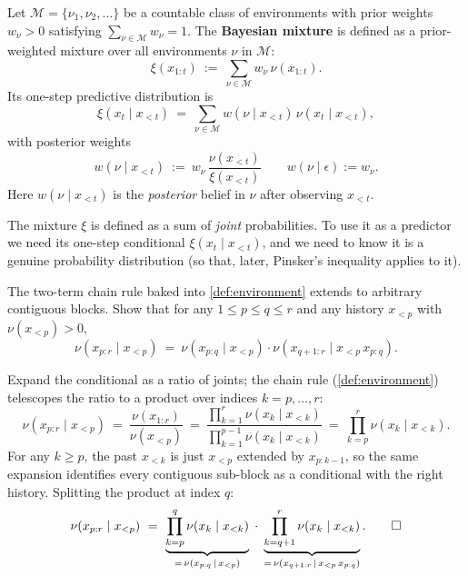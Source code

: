 \documentclass[fontsize=11pt, parskip=half]{scrartcl}
\newcommand{\Mc}{\mathcal{M}}
\begin{document}
\begin{definition}\label{def:mixture}
Let $\Mc = \{\nu_1, \nu_2, \dots\}$ be a countable class of environments with prior weights $w_\nu > 0$ satisfying $\sum_{\nu \in \Mc} w_\nu = 1$. The \textbf{Bayesian mixture} is defined as a prior-weighted mixture over all environments $\nu$ in $\Mc$:
\begin{equation}\label{eq:mixture_expression}
  \xi(x_{1:t}) ~:=~ \sum_{\nu \in \Mc} w_\nu\, \nu(x_{1:t}).
\end{equation}
Its one-step predictive distribution is
\[
  \xi(x_t \mid x_{<t}) ~=~ \sum_{\nu \in \Mc} w(\nu \mid x_{<t})\, \nu(x_t \mid x_{<t}),
\]
with posterior weights 
\[
w(\nu \mid x_{<t}) ~:=~ w_\nu\, \frac{\nu(x_{<t})}{\xi(x_{<t})}
\qquad w(\nu \mid \epsilon) := w_\nu.
\]
Here $w(\nu \mid x_{<t})$ is the \emph{posterior} belief in $\nu$ after observing $x_{<t}$.
\end{definition}

The mixture $\xi$ is defined as a sum of \emph{joint} probabilities. To use it as a predictor we need its one-step conditional $\xi(x_t \mid x_{<t})$, and we need to know it is a genuine probability distribution (so that, later, Pinsker's inequality applies to it).

\begin{exercise}
\label{prob:chain_rule_gen_ex}



The two-term chain rule baked into \cref{def:environment} extends to arbitrary contiguous blocks. Show that for any $1 \leq p \leq q \leq r$ and any history $x_{<p}$ with $\nu(x_{<p}) > 0$,
\[
  \nu(x_{p:r} \mid x_{<p}) ~=~ \nu(x_{p:q} \mid x_{<p}) \cdot \nu(x_{q+1:r} \mid x_{<p}\, x_{p:q}).
\]
\end{exercise}

\begin{solution}
Expand the conditional as a ratio of joints; the chain rule (\cref{def:environment}) telescopes the ratio to a product over indices $k = p, \ldots, r$:
\[
  \nu(x_{p:r} \mid x_{<p})
  ~=~ \frac{\nu(x_{1:r})}{\nu(x_{<p})}
  ~=~ \frac{\prod_{k=1}^{r} \nu(x_k \mid x_{<k})}{\prod_{k=1}^{p-1} \nu(x_k \mid x_{<k})}
  ~=~ \prod_{k=p}^{r} \nu(x_k \mid x_{<k}).
\]
For any $k \geq p$, the past $x_{<k}$ is just $x_{<p}$ extended by $x_{p:k-1}$, so the same expansion identifies every contiguous sub-block as a conditional with the right history. Splitting the product at index $q$:
\[
  \nu(x_{p:r} \mid x_{<p})
  ~=~ \underbrace{\prod_{k=p}^{q} \nu(x_k \mid x_{<k})}_{=\,\nu(x_{p:q}\,\mid\,x_{<p})}
  \;\cdot\; \underbrace{\prod_{k=q+1}^{r} \nu(x_k \mid x_{<k})}_{=\,\nu(x_{q+1:r}\,\mid\,x_{<p}\, x_{p:q})}. \qedhere
\]
\end{solution}
\end{document}
